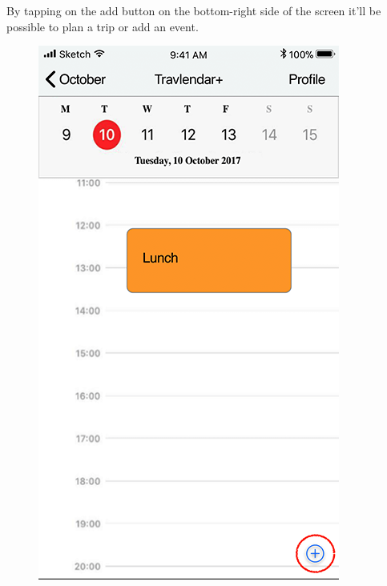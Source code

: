 By tapping on the add button on the bottom-right side of the screen it’ll be possible to plan a trip or add an event.
\begin{figure}[H]
	\centering
	\includegraphics[scale=0.23]{Images/Interface/Calendar/1_calendar+lunch}
	\hspace{0.5cm}

\end{figure}
